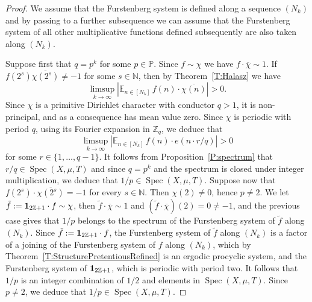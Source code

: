 \documentclass[11pt]{amsart}
\theoremstyle{definition}
\newcommand{\E}{{\mathbb E}}
\newcommand{\N}{{\mathbb N}}
\renewcommand{\P}{{\mathbb P}}
\newcommand{\Z}{{\mathbb Z}}
\DeclareMathOperator{\spec}{Spec}
\begin{document}
\begin{proof}
We assume that the Furstenberg system is defined along a sequence $(N_k)$ and  by passing to a further subsequence we can assume that the Furstenberg system of all other multiplicative functions defined subsequently are also taken along 
$(N_k)$. 


 Suppose first that $q=p^k$ for some $p\in \P$. Since $f\sim \chi$ we have $f\cdot \overline{\chi}\sim 1$. If  $f(2^s)\overline{\chi(2^s)}\neq -1$ for some $s\in \N$, then by Theorem~\ref{T:Halasz} we have  
$$
\limsup_{k\to\infty}|\E_{n\in [N_k]} \, f(n)\cdot \overline{\chi(n)} |>0.
$$
Since $\chi$ is a primitive Dirichlet character with conductor $q>1$, it is non-principal, and as a consequence has mean value zero. Since $\chi$ is periodic with period $q$,  using its Fourier expansion in $\Z_q$, we deduce that 
$$
\limsup_{k\to\infty}|\E_{n\in [N_k]} \, f(n)\cdot e(n\cdot r/q) |>0
$$
for some $r\in \{1,\ldots, q-1\}$. It follows from Proposition~\ref{P:spectrum} that $r/q\in \spec(X,\mu, T)$ and since $q=p^k$ and the spectrum is closed under integer multiplication, we deduce that $1/p\in \spec(X,\mu,T)$.
 Suppose now that $f(2^s)\cdot \overline{\chi(2^s)}=-1$ for every $s\in \N$. Then $\chi(2)\neq 0$, hence $p\neq 2$. We let $\tilde{f}:= {\bf 1}_{2\Z+1} \cdot f\sim \chi$, then $\tilde{f}\cdot \overline{\chi} \sim 1$ and 
$ (\tilde{f}\cdot \overline{\chi})(2)=0\neq -1$, and the  previous case gives that $1/p$ belongs to the spectrum of the Furstenberg system of $\tilde{f}$ along $(N_k)$. Since  $\tilde{f}:= {\bf 1}_{2\Z+1} \cdot f$, the Furstenberg system of $\tilde{f}$ along $(N_k)$ is a factor of a joining of the Furstenberg system of $f$ along $(N_k)$, which by Theorem~\ref{T:StructurePretentiousRefined} is an ergodic procyclic system, and  the Furstenberg system of ${\bf 1}_{2\Z+1}$, which is periodic with period two.  It follows that $1/p$ is an integer combination of 
$1/2$ and elements in $\spec(X,\mu,T)$. Since $p\neq 2$, we deduce that  $1/p\in \spec(X,\mu,T)$. 
  

\end{proof}
\end{document}
